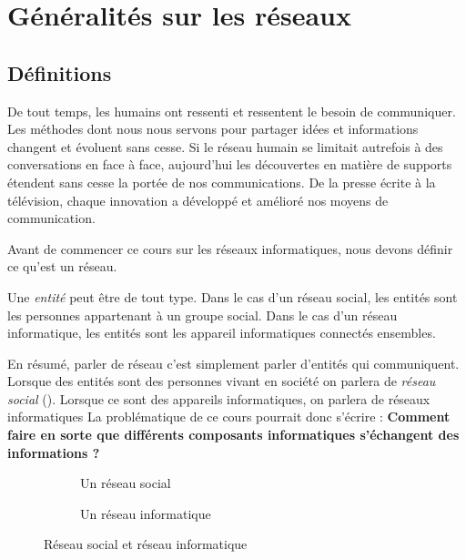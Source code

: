 \section{Généralités sur les réseaux}
\subsection{Définitions}

De tout temps, les humains ont ressenti et ressentent le besoin de communiquer.
Les méthodes dont nous nous servons pour partager idées et informations changent et évoluent sans cesse. Si le réseau humain se limitait autrefois à des conversations en face à face, aujourd'hui les découvertes en matière de supports étendent sans cesse la portée de nos communications. De la presse écrite à la télévision, chaque innovation a développé et amélioré nos moyens de communication.

Avant de commencer ce cours sur les réseaux informatiques, nous devons définir ce qu'est un réseau.


Une \textit{entité} peut être de tout type. Dans le cas d'un réseau social, les entités sont les personnes appartenant à un groupe social. Dans le cas d'un réseau informatique, les entités sont les appareil informatiques connectés ensembles.

En résumé, parler de réseau c'est simplement parler d'entités qui communiquent. Lorsque des entités sont des personnes vivant en société on parlera de \textit{réseau social} (\UPSTIfigure{\ref{fig:reseauSocial}}). Lorsque ce sont des appareils informatiques, on parlera de réseaux informatiques \UPSTIfigure{\ref{fig:reseauInformatique}} La problématique de ce cours pourrait donc s'écrire : \textbf{Comment faire en sorte que différents composants informatiques s'échangent des informations ? }

\begin{figure}[ht]
  \begin{subfigure}{.45\textwidth}
    \caption{Un réseau social}
    \label{fig:reseauSocial}
  \end{subfigure}
  \begin{subfigure}{.45\textwidth}
    \caption{Un réseau informatique}
    \label{fig:reseauInformatique}
  \end{subfigure}
  \caption{Réseau social et réseau informatique}
\end{figure}

